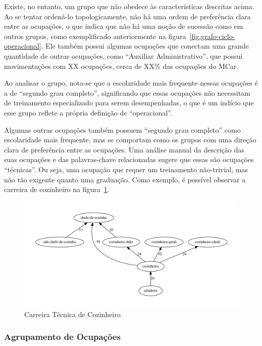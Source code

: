 \documentclass[12pt,a4paper,final]{article}
\begin{document}
Existe, no entanto, um grupo que não obedece às características descritas acima. Ao se tentar ordená-lo topologicamente, não há uma ordem de preferência clara entre as ocupações, o que indica que não há uma noção de sucessão como em outros grupos, como exemplificado anteriormente na figura~\ref{fig:grafo-ciclo-operacional}. Ele também possui algumas ocupações que conectam uma grande quantidade de outras ocupações, como \enquote{Auxiliar Administrativo}, que possui movimentações com XX ocupações, cerca de XX\% das ocupações do MCar.

Ao analisar o grupo, nota-se que a escolaridade mais frequente nessas ocupações é a de \enquote{segundo grau completo}, significando que essas ocupações não necessitam de treinamento especializado para serem desempenhadas, o que é um indício que esse grupo reflete a própria definição de \enquote{operacional}.

Algumas outras ocupações também possuem \enquote{segundo grau completo} como escolaridade mais frequente, mas se comportam como os grupos com uma direção clara de preferência entre as ocupações. Uma análise manual da descrição das suas ocupações e das palavras-chave relacionadas sugere que essas são ocupações \enquote{técnicas}. Ou seja, uma ocupação que requer um treinamento não-trivial, mas não tão exigente quanto uma graduação. Como exemplo, é possível observar a carreira de cozinheiro na figura~\ref{fig:exemplo-grafo-cozinheiro}.

\begin{figure}[htb]
  \centering
  \includegraphics[scale=0.6]{subcluster_01_11.pdf}
  \caption{Carreira Técnica de Cozinheiro}
  \label{fig:exemplo-grafo-cozinheiro}
\end{figure}

\subsubsection{Agrupamento de Ocupações}
\end{document}
